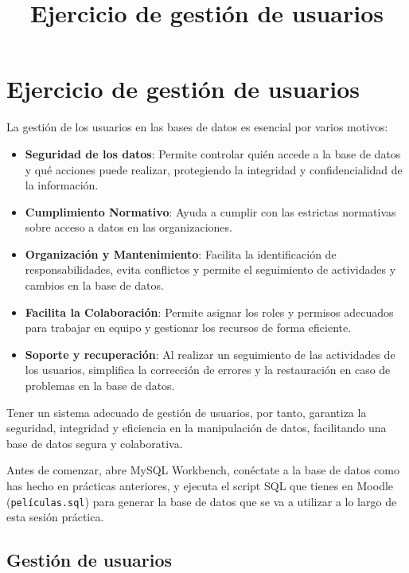 \documentclass{db-practice}
\begin{document}
\title{Ejercicio de gestión de usuarios}

\section*{Ejercicio de gestión de usuarios}

La gestión de los usuarios en las bases de datos es esencial por varios motivos:

\begin{itemize}
    \item \textbf{Seguridad de los datos}: Permite controlar quién accede a la base de datos y qué acciones puede realizar, protegiendo la integridad y confidencialidad de la información.

    \item \textbf{Cumplimiento Normativo}: Ayuda a cumplir con las estrictas normativas sobre acceso a datos en las organizaciones.

    \item \textbf{Organización y Mantenimiento}: Facilita la identificación de responsabilidades, evita conflictos y permite el seguimiento de actividades y cambios en la base de datos.

    \item \textbf{Facilita la Colaboración}: Permite asignar los roles y permisos adecuados para trabajar en equipo y gestionar los recursos de forma eficiente.

    \item \textbf{Soporte y recuperación}: Al realizar un seguimiento de las actividades de los usuarios, simplifica la corrección de errores y la restauración en caso de problemas en la base de datos.
\end{itemize}

Tener un sistema adecuado de gestión de usuarios, por tanto, garantiza la seguridad, integridad y eficiencia en la manipulación de datos, facilitando una base de datos segura y colaborativa.

Antes de comenzar, abre MySQL Workbench, conéctate a la base de datos como has hecho en prácticas anteriores, y ejecuta el script SQL que tienes en Moodle (\texttt{películas.sql}) para generar la base de datos que se va a utilizar a lo largo de esta sesión práctica.

\subsection*{Gestión de usuarios}
\end{document}
